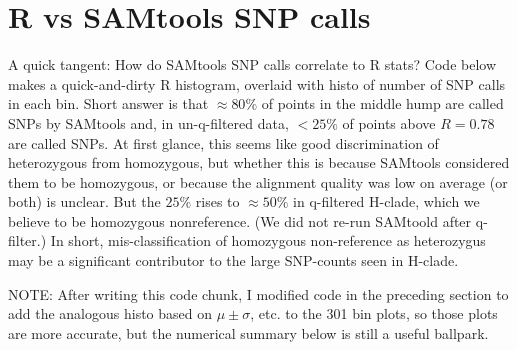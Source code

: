 \documentclass{article}\usepackage[]{graphicx}\usepackage[]{color}
\begin{document}
\section{R vs SAMtools SNP calls}
\label{sec:rvsam}

A quick tangent: How do SAMtools SNP calls correlate to R stats?  Code below makes a quick-and-dirty R histogram, overlaid with histo of number of SNP calls in each bin.  Short answer is that $\approx80\%$ of points in the middle hump are called SNPs by SAMtools and, in un-q-filtered data, $<25\%$ of points above $R=0.78$ are called SNPs.  At first glance, this seems like good discrimination of heterozygous from homozygous, but whether this is because SAMtools considered them to be homozygous, or because the alignment quality was low on average (or both) is unclear.  But the $25\%$ rises to $\approx50\%$ in q-filtered H-clade, which we believe to be homozygous nonreference.  (We did not re-run SAMtoold after q-filter.)  In short, mis-classification of homozygous non-reference as heterozygus may be a significant contributor to the large SNP-counts seen in H-clade.  

NOTE: After writing this code chunk, I modified code in the preceding section to add the analogous histo based on $\mu\pm\sigma$, etc. to the 301 bin plots, so those plots are more accurate, but the numerical summary below is still a useful ballpark.
\end{document}
